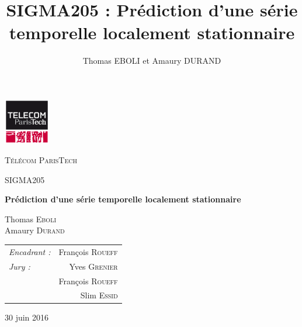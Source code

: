 \documentclass{report}
\title{SIGMA205 : Prédiction d'une série temporelle localement
stationnaire}
\author{Thomas EBOLI et Amaury DURAND}
\begin{document}
\begin{titlepage}
	\centering
	\includegraphics[width=0.15\textwidth]{TelecomParisTech_logo_100_01}\par\vspace{1cm}
	{\scshape\LARGE Télécom ParisTech \par}
	\vspace{1cm}
	{\scshape\Large SIGMA205 \par}
	\vspace{1.5cm}
	{\huge\bfseries Prédiction d'une série temporelle localement
stationnaire \par}
	\vspace{2cm}
	\vfill
    \begin{minipage}{0.4\textwidth}
      \begin{flushleft} \large
        Thomas \textsc{Eboli}\\
        Amaury \textsc{Durand}\\
      \end{flushleft}
    \end{minipage}
    \begin{minipage}{0.4\textwidth}
      \begin{tabular}{lr} \large
        \emph{Encadrant :} & François \textsc{Roueff}\\
        \large \emph{Jury :} & Yves \textsc{Grenier} \\ 
         & 	François \textsc{Roueff} \\ 
         &	Slim \textsc{Essid}
      \end{tabular}
    \end{minipage}

    \vfill

	{\large 30 juin 2016 \par}
\end{titlepage}
\end{document}
